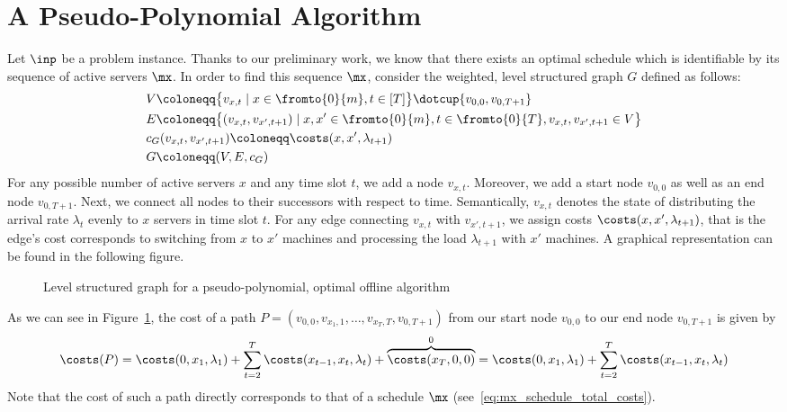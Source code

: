 \section{A Pseudo-Polynomial Algorithm}\label{sec:opt_offline_pseudo_poly}
Let $\inp$ be a problem instance. Thanks to our preliminary work, we know that there exists an optimal schedule which is identifiable by its sequence of active servers $\mx$. In order to find this sequence $\mx$, consider the weighted, level structured graph $G$ defined as follows:
\begin{align*}
	&V\coloneqq\bigl\{v_{x,t}\mid x\in\fromto{0}{m},t\in[T]\bigr\}\dotcup\{v_{0,0},v_{0,T+1}\}\\
	&E\coloneqq\bigl\{(v_{x,t},v_{x',t+1})\mid x,x'\in\fromto{0}{m},t\in\fromto{0}{T},v_{x,t},v_{x',t+1}\in V\bigr\}\\
	&c_G(v_{x,t},v_{x',t+1})\coloneqq\costs(x,x',\lambda_{t+1})\\
	&G\coloneqq(V,E,c_G)
\end{align*}
For any possible number of active servers $x$ and any time slot $t$, we add a node $v_{x,t}$. Moreover, we add a start node $v_{0,0}$ as well as an end node $v_{0,T+1}$. Next, we connect all nodes to their successors with respect to time. Semantically, $v_{x,t}$ denotes the state of distributing the arrival rate $\lambda_{t}$ evenly to $x$ servers in time slot $t$. For any edge connecting $v_{x,t}$ with $v_{x',t+1}$, we assign costs $\costs(x,x',\lambda_{t+1})$, that is the edge's cost corresponds to switching from $x$ to $x'$ machines and processing the load $\lambda_{t+1}$ with $x'$ machines. A graphical representation can be found in the following figure.
\begin{figure}[H]

\caption{Level structured graph for a pseudo-polynomial, optimal offline algorithm}
\label{fig:graph_pseudo_poly}
\end{figure}
As we can see in Figure~\ref{fig:graph_pseudo_poly}, the cost of a path $P=(v_{0,0},v_{x_1,1},\dotsc,v_{x_T,T},v_{0,T+1})$ from our start node $v_{0,0}$ to our end node $v_{0,T+1}$ is given by 
\begin{equation}
	\costs(P)=\costs(0,x_1,\lambda_1)+\sum\limits_{t=2}^{T}\costs(x_{t-1},x_{t},\lambda_{t})+\overbrace{\costs(x_T,0,0)}^{0}=\costs(0,x_1,\lambda_1)+\sum\limits_{t=2}^{T}\costs(x_{t-1},x_{t},\lambda_{t})\label{eq:v0_VT1_path_costs}
\end{equation}
Note that the cost of such a path directly corresponds to that of a schedule $\mx$ (see~\eqref{eq:mx_schedule_total_costs}).
